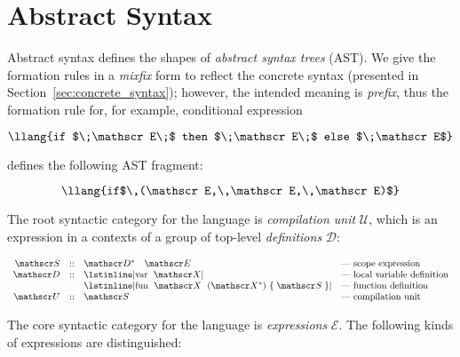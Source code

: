 \section{Abstract Syntax}

Abstract syntax defines the shapes of \emph{abstract syntax trees} (AST). We give the formation rules in a \emph{mixfix} form to
reflect the concrete syntax (presented in Section~\ref{sec:concrete_syntax}); however, the intended meaning is \emph{prefix},
thus the formation rule for, for example, conditional expression

\[
\mbox{\llang{if $\;\mathscr E\;$ then $\;\mathscr E\;$ else $\;\mathscr E$}}
\]

defines the following AST fragment:

\[
\mbox{\llang{if$\,(\mathscr E,\,\mathscr E,\,\mathscr E)$}}
\]

The root syntactic category for the language is \emph{compilation unit} $\mathscr U$, which is an expression in a contexts of
a group of top-level \emph{definitions} $\mathscr D$:

\[
\begin{array}{rcll}
  \mathscr S & :: & \mathscr D^*\quad \mathscr E & \mbox{--- scope expression}\\
  \mathscr D & :: & \mbox{\lstinline|var $\;\mathscr X$|} & \mbox{--- local variable definition} \\
             &    & \mbox{\lstinline|fun $\;\mathscr X\;$ ($\mathscr X^*$) \{$\;\mathscr S\;$\}|} & \mbox{--- function definition}\\
  \mathscr U & :: & \mathscr S & \mbox{--- compilation unit}
\end{array}
\]

The core syntactic category for the language is \emph{expressions} $\mathscr E$. The following kinds of
expressions are distinguished:

